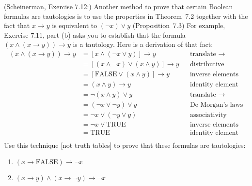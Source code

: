 \documentclass{article}
\theoremstyle{definition}
\begin{document}
\begin{question}
   (Scheinerman, Exercise 7.12:)
    Another method to prove that certain Boolean formulas
    are tautologies is to use the properties in Theorem~7.2
    together with the fact that $x \rightarrow y$ is equivalent
    to $(\lnot x) \lor y$ (Proposition~7.3)
    For example, Exercise 7.11, part (b) asks you to establish that the formula $(x \land (x \rightarrow y)) \rightarrow y$ is 
    a tautology.  Here is a derivation of that fact:
    \begin{align*}
        (x \land (x \rightarrow y)) \rightarrow y
        &= [x \land (\lnot x \lor y)] \rightarrow y
        && \text{translate $\rightarrow$} 
        \\
        &= [(x \land \lnot x) \lor (x \land y)] \rightarrow y
        && \text{distributive}
        \\
        &= [\mathrm{FALSE} \lor (x\land y)] \rightarrow y
        && \text{inverse elements}
        \\
        &= (x\land y) \rightarrow y
        && \text{identity element}
        \\
        &= \lnot(x\land y) \lor y
        && \text{translate $\rightarrow$}
        \\
        &= (\lnot x \lor \lnot y) \lor y
        && \text{De~Morgan's laws}
        \\
        &= \lnot x \lor (\lnot y \lor y)
        && \text{associativity}
        \\
        &= \lnot x \lor \mathrm{TRUE}
        && \text{inverse elements}
        \\
        &= \mathrm{TRUE}
        && \text{identity element}
        \\
    \end{align*}
    Use this technique [not truth tables] to prove that these formulas
    are tautologies:
    \begin{enumerate}
        \item $(x \rightarrow \mathrm{FALSE}) \rightarrow \lnot x$
        \item $(x \rightarrow y) \land (x \rightarrow \lnot y) \rightarrow \lnot x$
    \end{enumerate}
\end{question}
\end{document}
